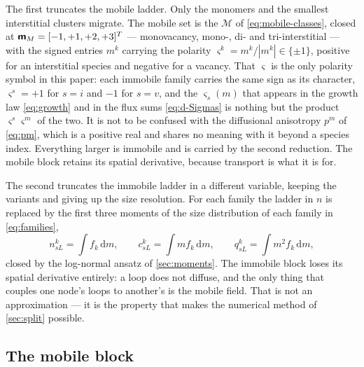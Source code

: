 The first truncates the mobile ladder. Only the monomers and the smallest
interstitial clusters migrate. The mobile set is the $\mathcal M$ of
\cref{eq:mobile-classes}, closed at
$\bm{\mathsf{m}}_M=[-1,+1,+2,+3]^{T}$ --- monovacancy, mono-, di- and tri-interstitial
--- with the signed entries $m^k$ carrying the polarity
$\varsigma^{k}=m^{k}/|m^{k}|\in\{\pm1\}$, positive for an interstitial species
and negative for a vacancy. That $\varsigma$ is the only polarity symbol in this
paper: each immobile family carries the same sign as its character,
$\varsigma^{s}=+1$ for $s=i$ and $-1$ for $s=v$, and the $\varsigma_s(m)$ that
appears in the growth law \cref{eq:growth} and in the flux sums
\cref{eq:d-Sigmas} is nothing but the product $\varsigma^{s}\varsigma^{m}$ of
the two. It is not to be confused with the diffusional anisotropy $p^{m}$ of
\cref{eq:pm}, which is a positive real and shares no meaning with it beyond a
species index. Everything larger is immobile and is carried by the second
reduction. The mobile block retains its spatial derivative, because transport is
what it is for.

The second truncates the immobile ladder in a different variable, keeping the
variants and giving up the size resolution. For each family the ladder in $n$
is replaced by the first three moments of
the size distribution of each family in \cref{eq:families},
\begin{equation}
  n^k_{sL}=\!\int\! f_k\,\mathrm{d}m,
  \qquad
  c^k_{sL}=\!\int\! m f_k\,\mathrm{d}m,
  \qquad
  q^k_{sL}=\!\int\! m^2 f_k\,\mathrm{d}m,
  \label{eq:moments-def}
\end{equation}
closed by the log-normal ansatz of \cref{sec:moments}. The immobile block loses
its spatial derivative entirely: a loop does not diffuse, and the only thing
that couples one node's loops to another's is the mobile field. That is not an
approximation --- it is the property that makes the numerical method of
\cref{sec:split} possible.

\subsection{The mobile block}
\label{sec:mobile}


